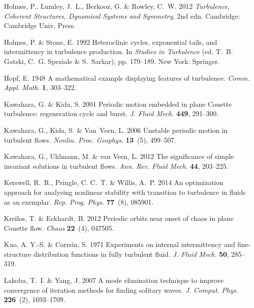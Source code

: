 \documentclass{jfm}
\begin{document}
\begin{thebibliography}{73}
{\sc Holmes, P., Lumley, J.~L., Berkooz, G. \& Rowley, C.~W.} 2012 {\em
  Turbulence, Coherent Structures, Dynamical Systems and Symmetry\/}, 2nd edn.
  Cambridge: Cambridge Univ. Press.

{\sc Holmes, P. \& Stone, E.} 1992 Heteroclinic cycles, exponential tails, and
  intermittency in turbulence production. In {\em Studies in Turbulence\/} (ed.
  T.~B. Gatski, C.~G. Speziale \& S.~Sarkar), pp. 179--189. New York: Springer.

{\sc Hopf, E.} 1948 A mathematical example displaying features of turbulence.
  {\em Comm. Appl. Math.\/} {\bf 1}, 303--322.

{\sc Kawahara, G. \& Kida, S.} 2001 Periodic motion embedded in plane {C}ouette
  turbulence: regeneration cycle and burst. {\em J. Fluid Mech.\/} {\bf 449},
  291--300.

{\sc Kawahara, G., Kida, S. \& Van~Veen, L.} 2006 Unstable periodic motion in
  turbulent flows. {\em Nonlin. Proc. Geophys.\/} {\bf 13}~(5), 499--507.

{\sc Kawahara, G., Uhlmann, M. \& van Veen, L.} 2012 The significance of simple
  invariant solutions in turbulent flows. {\em Ann. Rev. Fluid Mech.\/} {\bf
  44}, 203--225.

{\sc Kerswell, R.~R., Pringle, C. C.~T. \& Willis, A.~P.} 2014 An optimization
  approach for analysing nonlinear stability with transition to turbulence in
  fluids as an exemplar. {\em Rep. Prog. Phys.\/} {\bf 77}~(8), 085901.

{\sc Kreilos, T. \& Eckhardt, B.} 2012 Periodic orbits near onset of chaos in
  plane {C}ouette flow. {\em Chaos\/} {\bf 22}~(4), 047505.

{\sc Kuo, A. Y.-S. \& Corrsin, S.} 1971 Experiments on internal intermittency
  and fine-structure distribution functions in fully turbulent fluid. {\em J.
  Fluid Mech.\/} {\bf 50}, 285--319.

{\sc Lakoba, T.~I. \& Yang, J.} 2007 A mode elimination technique to improve
  convergence of iteration methods for finding solitary waves. {\em J. Comput.
  Phys.\/} {\bf 226}~(2), 1693--1709.


\end{thebibliography}
\end{document}
